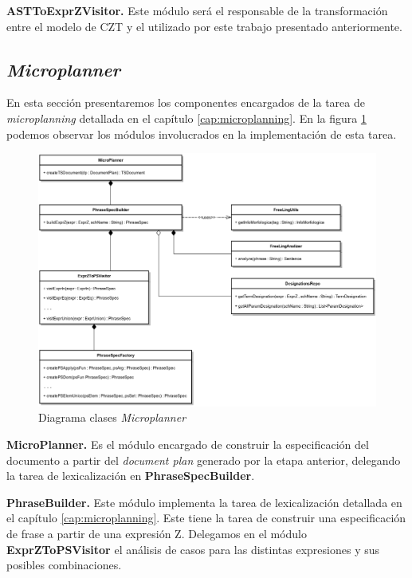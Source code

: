 \bigskip
\noindent
\textbf{ASTToExprZVisitor.} Este módulo será el responsable de la transformación entre el modelo de CZT y el utilizado por este trabajo presentado anteriormente.


\subsection{\textit{Microplanner}}

En esta sección presentaremos los componentes encargados de la tarea de \textit{microplanning} detallada en el capítulo \ref{cap:microplanning}. En la figura \ref{fig:imp_microplanner} podemos observar los módulos involucrados en la implementación de esta tarea.

\begin{figure}[H]
  	\centering
	\includegraphics[scale=0.2]{img/microplanner_imp.png}
	\caption{Diagrama clases \textit{Microplanner}}
  	\label{fig:imp_microplanner}
\end{figure}

\bigskip
\noindent
\textbf{MicroPlanner.} Es el módulo encargado de construir la especificación del documento a partir del \textit{document plan} generado por la etapa anterior, delegando la tarea de lexicalización en \textbf{PhraseSpecBuilder}.

\bigskip
\noindent
\textbf{PhraseBuilder.} Este módulo implementa la tarea de lexicalización detallada en el capítulo \ref{cap:microplanning}. Este tiene la tarea de construir una especificación de frase a partir de una expresión Z. Delegamos en el módulo \textbf{ExprZToPSVisitor} el análisis de casos para las distintas expresiones y sus posibles combinaciones.

